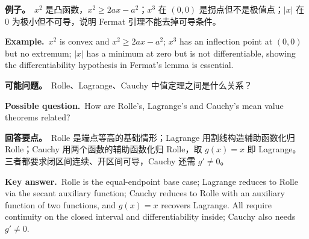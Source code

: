 \documentclass[UTF8,11pt,a4paper]{ctexart}
\newcommand{\EX}[2]{\par\noindent\textbf{例子。}\ #1\par\noindent\textbf{Example.}\ #2\par}
\newcommand{\ASK}[4]{\begin{samepage}\par\noindent\textbf{可能问题。}\ #1\par\noindent\textbf{Possible question.}\ #2\par\noindent\textbf{回答要点。}\ #3\par\noindent\textbf{Key answer.}\ #4\medskip\end{samepage}}
\begin{document}
\EX{$x^2$ 是凸函数，$x^2\ge2ax-a^2$；$x^3$ 在 $(0,0)$ 是拐点但不是极值点；$|x|$ 在 $0$ 为极小但不可导，说明 Fermat 引理不能去掉可导条件。}{$x^2$ is convex and $x^2\ge2ax-a^2$; $x^3$ has an inflection point at $(0,0)$ but no extremum; $|x|$ has a minimum at zero but is not differentiable, showing the differentiability hypothesis in Fermat's lemma is essential.}
\ASK{Rolle、Lagrange、Cauchy 中值定理之间是什么关系？}{How are Rolle's, Lagrange's and Cauchy's mean value theorems related?}{Rolle 是端点等高的基础情形；Lagrange 用割线构造辅助函数化归 Rolle；Cauchy 用两个函数的辅助函数化归 Rolle，取 $g(x)=x$ 即 Lagrange。三者都要求闭区间连续、开区间可导，Cauchy 还需 $g'\ne0$。}{Rolle is the equal-endpoint base case; Lagrange reduces to Rolle via the secant auxiliary function; Cauchy reduces to Rolle with an auxiliary function of two functions, and $g(x)=x$ recovers Lagrange. All require continuity on the closed interval and differentiability inside; Cauchy also needs $g'\ne0$.}
\end{document}

